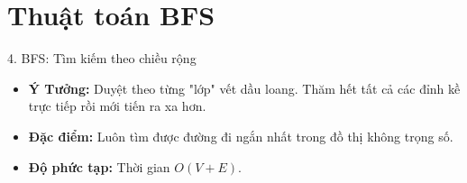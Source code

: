 \section{Thuật toán BFS}
\begin{frame}{4. BFS: Tìm kiếm theo chiều rộng}
    \begin{itemize}
        \item \textbf{Ý Tưởng:} Duyệt theo từng "lớp" vết dầu loang. Thăm hết tất cả các đỉnh kề trực tiếp rồi mới tiến ra xa hơn.
        \item \textbf{Đặc điểm:} Luôn tìm được đường đi ngắn nhất trong đồ thị không trọng số.
        \item \textbf{Độ phức tạp:} Thời gian $O(V + E)$.
    \end{itemize}
\end{frame}

